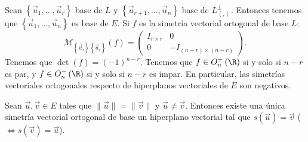 \begin{observation}
\normalfont 
Sean $\displaystyle \left\{ \vec{u}_{1}, \ldots, \vec{u}_{r}\right\}  $ base de $\displaystyle L $ y $\displaystyle \left\{ \vec{u}_{r+1}, \ldots, \vec{u}_{n}\right\}  $ base de $\displaystyle L^{\perp }_{\left\langle ,  \right\rangle } $. Entonces tenemos que $\displaystyle \left\{ \vec{u}_{1}, \ldots, \vec{u}_{n}\right\}  $ es base de $\displaystyle E $. Si $\displaystyle f $ es la simetría vectorial ortogonal de base $\displaystyle L $:
\[\mathcal{M}_{ \left\{ \vec{u}_{i}\right\} \left\{ \vec{u}_{i}\right\} }\left(f\right) = \begin{pmatrix} I_{r \times r} & 0 \\
0 & -I_{\left(n -r\right)\times\left(n-r\right)}\end{pmatrix} .\]
Tenemos que $\displaystyle \det\left(f\right) = \left(-1\right)^{n-r} $. Tenemos que $\displaystyle f \in O^{+}_{n}\left(\R\right) $ si y solo si $\displaystyle n-r $ es par, y $\displaystyle f \in O^{-}_{n}\left(\R\right) $ si y solo si $\displaystyle n-r $ es impar. En particular, las simetrías vectoriales ortogonales respecto de hiperplanos vectoriales de $\displaystyle E $ son negativos.
\end{observation}
\begin{ftheorem}[]
\normalfont Sean $\displaystyle \vec{u}, \vec{v} \in E $ tales que $\displaystyle \|\vec{u}\| = \|\vec{v}\| $ y $\displaystyle \vec{u} \neq \vec{v} $. Entonces existe una única simetría vectorial ortogonal de base un hiperplano vectorial tal que $\displaystyle s\left(\vec{u}\right) = \vec{v} $ ($\displaystyle \iff s\left(\vec{v}\right) = \vec{u} $).
\end{ftheorem}
